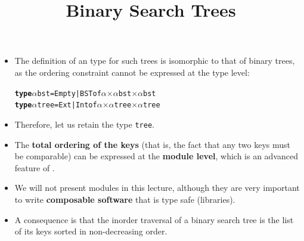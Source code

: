 \documentclass[wide]{slides}
\begin{document}
\begin{slide}
  \title{Binary Search Trees}

  \begin{itemize}

    \item The definition of an \OCaml type for such trees is
      isomorphic to that of binary trees, as the ordering constraint
      cannot be expressed at the type level:
      \smallskip
\begin{alltt}
\textbf{type} \(\alpha\) bst = Empty | BST of \(\alpha\) \(\times\) \(\alpha\) bst \(\times\) \(\alpha\) bst
\textbf{type} \(\alpha\) tree = Ext | Int of \(\alpha\) \(\times\) \(\alpha\) tree \(\times\) \(\alpha\) tree
\end{alltt}

   \item Therefore, let us retain the type \texttt{tree}.

   \item The \textbf{total ordering of the keys} (that is, the fact
     that any two keys must be comparable) can be expressed at the
     \textbf{module level}, which is an advanced feature of \OCaml.

   \item We will not present modules in this lecture, although they
     are very important to write \textbf{composable software} that is
     type safe (libraries).

   \item A consequence is that the inorder traversal of a binary
     search tree is the list of its keys sorted in non\hyp{}decreasing
     order.

  \end{itemize}

\end{slide}
\end{document}
